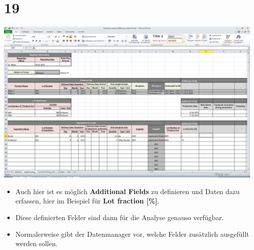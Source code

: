 \documentclass{beamer}
\begin{document}
\section{19}
\begin{frame}
	\begin{center}
  		\includegraphics[height=0.6\textheight]{19.png}
	\end{center}
	\begin{itemize}
		\item Auch hier ist es möglich \textbf{Additional Fields} zu definieren und Daten dazu erfassen, hier im Beispiel für \textbf{Lot fraction [\%]}.
		\item Diese definierten Felder sind dann für die Analyse genauso verfügbar.
		\item Normalerweise gibt der Datenmanager vor, welche Felder zusätzlich ausgefüllt werden sollen.
	\end{itemize}
\end{frame}
\end{document}
